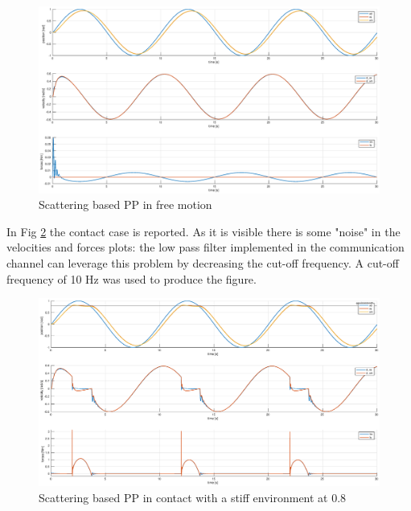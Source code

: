 \documentclass[a4paper,12pt]{article}
\begin{document}
\begin{figure}[H]
    \begin{center}
        \hspace*{-4.5cm}
        \includegraphics[scale=0.5]{images/scat_pp_free.eps}
    \end{center}
    \caption{Scattering based PP in free motion}
    \label{fig:scat_pp_free}
\end{figure}

\newpage
In Fig \ref{fig:scat_pp_contact} the contact case is reported. As it is visible there is some "noise" in the velocities and forces plots: the low pass filter implemented in the communication channel can leverage this problem by decreasing the cut-off frequency. A cut-off frequency of 10 Hz was used to produce the figure.

\begin{figure}[H]
    \begin{center}
        \hspace*{-4.5cm}
        \includegraphics[scale=0.5]{images/scat_pp_contact.eps}
    \end{center}
    \caption{Scattering based PP in contact with a stiff environment at 0.8}
    \label{fig:scat_pp_contact}
\end{figure}
\end{document}
